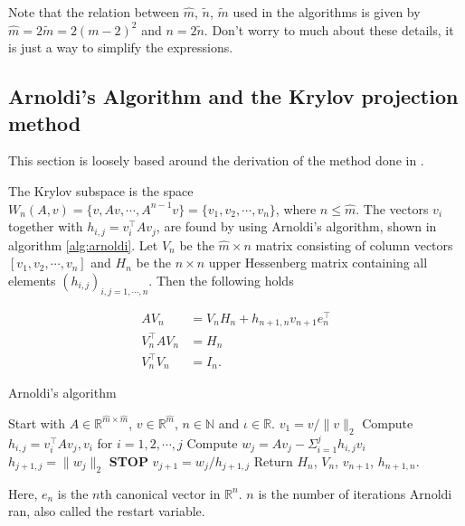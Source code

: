 Note that the relation between $\hat{m}$, $\tilde{n}$, $\tilde{m}$ used in the algorithms is given by $\hat{m} = 2\tilde{m}= 2(m-2)^2$ and $ n = 2\tilde{n}$. Don't worry to much about these details, it is just a way to simplify the expressions.\\
\subsection{Arnoldi's Algorithm and the Krylov projection method}
This section is loosely based around the derivation of the method done in \cite{!!!!!!referer!!!!!!!!!}.

The Krylov subspace is the space $W_n (A,v) = \{v,Av, \cdots, A^{n-1}v\} = \{v_1,v_2,\cdots,v_n\} $, where $n \leq \hat{m}$.
The vectors $v_i$ together with $h_{i,j} = v_i^\top Av_j$, are found by using Arnoldi's algorithm, shown in algorithm \ref{alg:arnoldi}. Let $V_n$ be the $\hat{m} \times n$ matrix consisting of column vectors $[v_1,v_2,\cdots,v_n ] $ and $H_n$ be the $n \times n$ upper Hessenberg matrix containing all elements $(h_{i,j})_{i,j=1,\cdots,n}$. Then the following holds \cite{kryprop}

\begin{equation}
\begin{aligned}
AV_n & = V_n H_n + h_{n+1,n}v_{n+1}e^\top_n  \\
V^{\top}_n AV_n &= H_n  \\
V_n^{\top} V_n &= I_n. 
\label{eqn:propA}
\end{aligned}
\end{equation}

\begin{algorithm} [h!]
\begin{algorithmic} \caption{Arnoldi's algorithm\cite{arnold}} \label{alg:arnoldi}  
\STATE Start with $A \in \mathbb{R}^{\hat{m} \times \hat{m}}$, $v \in \mathbb{R}^{\hat{m}}$, $n \in \mathbb{N}$ and $\iota \in \mathbb{R}$.
\STATE $v_1 = v/\|v \|_2$
   \STATE Compute $h_{i,j} =  v_i^{\top}Av_j,v_i $ for $i = 1,2,\cdots, j$
    \STATE Compute $w_j = A v_j - \Sigma_{i=1}^{j} h_{i,j}v_i $
    \STATE $h_{j+1,j} = \| w_j \|_2$
        \STATE\textbf{STOP}
    \ENDIF 
   \STATE $v_{j+1} = w_j/h_{j+1,j}$
\ENDFOR
\STATE Return $H_n$, $V_n$, $v_{n+1}$, $h_{n+1,n}$.
\end{algorithmic} 
\end{algorithm}



Here, $e_n$ is the $n$th canonical vector in $\mathbb{R}^n$. $n$ is the number of iterations Arnoldi ran, also called the restart variable.\\

